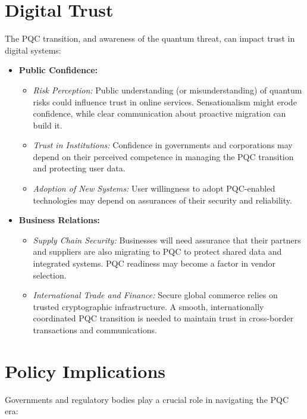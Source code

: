 \section{Digital Trust}\label{sec:trust_ch9}

The PQC transition, and awareness of the quantum threat, can impact trust in digital systems:

\begin{itemize}
    \item \textbf{Public Confidence:}
    \begin{itemize}
        \item \textit{Risk Perception:} Public understanding (or misunderstanding) of quantum risks could influence trust in online services. Sensationalism might erode confidence, while clear communication about proactive migration can build it.
        \item \textit{Trust in Institutions:} Confidence in governments and corporations may depend on their perceived competence in managing the PQC transition and protecting user data.
        \item \textit{Adoption of New Systems:} User willingness to adopt PQC-enabled technologies may depend on assurances of their security and reliability.
    \end{itemize}
    \item \textbf{Business Relations:}
    \begin{itemize}
        \item \textit{Supply Chain Security:} Businesses will need assurance that their partners and suppliers are also migrating to PQC to protect shared data and integrated systems. PQC readiness may become a factor in vendor selection.
        \item \textit{International Trade and Finance:} Secure global commerce relies on trusted cryptographic infrastructure. A smooth, internationally coordinated PQC transition is needed to maintain trust in cross-border transactions and communications.
    \end{itemize}
\end{itemize}

\section{Policy Implications}\label{sec:policy_ch9}

Governments and regulatory bodies play a crucial role in navigating the PQC era:

